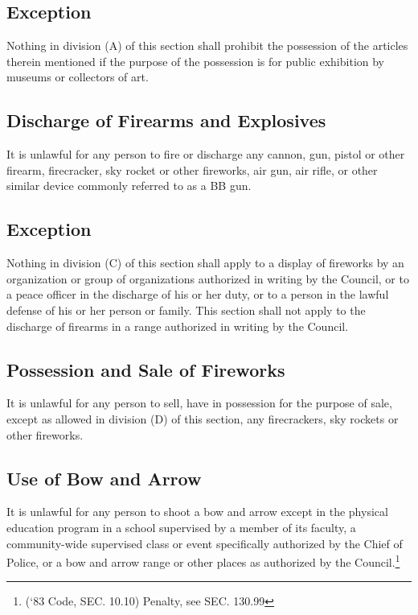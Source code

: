 \subsection{Exception}
Nothing in division (A) of this section shall prohibit the possession of the articles therein mentioned if the purpose of the possession is for public exhibition by museums or collectors of art.
\subsection{Discharge of Firearms and Explosives}
It is unlawful for any person to fire or discharge any cannon, gun, pistol or other firearm, firecracker, sky rocket or other fireworks, air gun, air rifle, or other similar device commonly referred to as a BB gun.
\subsection{Exception}
Nothing in division (C) of this section shall apply to a display of fireworks by an organization or group of organizations authorized in writing by the Council, or to a peace officer in the discharge of his or her duty, or to a person in the lawful defense of his or her person or family.  This section shall not apply to the discharge of firearms in a range authorized in writing by the Council.
\subsection{Possession and Sale of Fireworks}
It is unlawful for any person to sell, have in possession for the purpose of sale, except as allowed in division (D) of this section, any firecrackers, sky rockets or other fireworks.
\subsection{Use of Bow and Arrow}
It is unlawful for any person to shoot a bow and arrow except in the physical education program in a school supervised by a member of its faculty, a community-wide supervised class or event specifically authorized by the Chief of Police, or a bow and arrow range or other places as authorized by the Council.\footnote{(‘83 Code, SEC. 10.10)  Penalty, see SEC. 130.99}
